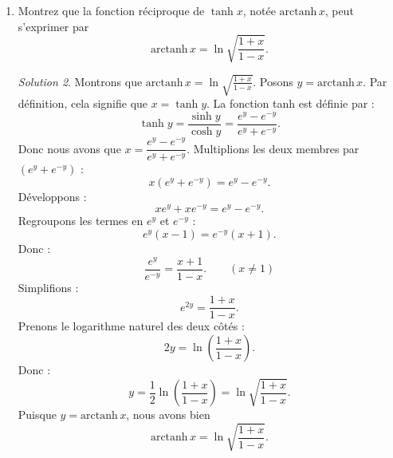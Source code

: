 \documentclass[
  12pt,
  letterpaper,
]{book}
\newenvironment{Shaded}{}{}
\newcommand{\CommentTok}[1]{\textcolor[rgb]{0.42,0.45,0.49}{#1}}
\newcommand{\FloatTok}[1]{\textcolor[rgb]{0.00,0.36,0.77}{#1}}
\newcommand{\NormalTok}[1]{\textcolor[rgb]{0.14,0.16,0.18}{#1}}
\newcommand{\OperatorTok}[1]{\textcolor[rgb]{0.14,0.16,0.18}{#1}}
\newcommand{\StringTok}[1]{\textcolor[rgb]{0.01,0.18,0.38}{#1}}
\newcommand{\VariableTok}[1]{\textcolor[rgb]{0.89,0.38,0.04}{#1}}
\theoremstyle{remark}
\newtheorem*{solution}{Solution}
\begin{document}
\begin{enumerate}
\begin{solution}
\begin{Shaded}
\begin{Highlighting}[]
\CommentTok{\# Configuration du graphique}
\NormalTok{plt.grid(}\VariableTok{True}\NormalTok{, alpha}\OperatorTok{=}\FloatTok{0.3}\NormalTok{)}
\NormalTok{plt.title(}\StringTok{\textquotesingle{}Fonction tanh(x)\textquotesingle{}}\NormalTok{)}
\NormalTok{plt.xlabel(}\StringTok{\textquotesingle{}x\textquotesingle{}}\NormalTok{)}
\NormalTok{plt.ylabel(}\StringTok{\textquotesingle{}y\textquotesingle{}}\NormalTok{)}
\NormalTok{plt.legend()}

\CommentTok{\# Ajustement des limites}
\NormalTok{plt.ylim(}\OperatorTok{{-}}\FloatTok{1.5}\NormalTok{, }\FloatTok{1.5}\NormalTok{)}

\NormalTok{plt.show()}
\end{Highlighting}
\end{Shaded}

  \begin{figure}[H]

  {\centering \texttt{[image: exercices/FonctionsHyp/FonctionsHyp\_files/figure-pdf/cell-2-output-1.pdf]}

  }

  \end{figure}

  \end{solution}
\item
  Montrez que la fonction réciproque de \(\tanh x\), notée
  \(\text{arctanh}\,x\), peut s'exprimer par
  \[\text{arctanh}\,x = \ln \sqrt{\frac{1+x}{1-x}}.\]

  \begin{solution}

  Montrons que \(\text{arctanh}\,x = \ln \sqrt{\frac{1+x}{1-x}}\).
  Posons \(y = \text{arctanh}\,x\). Par définition, cela signifie que
  \(x = \tanh y\). La fonction tanh est définie par :
  \[\tanh y = \frac{\sinh y}{\cosh y} = \frac{e^y - e^{-y}}{e^y + e^{-y}}.\]
  Donc nous avons que \(x = \dfrac{e^y - e^{-y}}{e^y + e^{-y}}\).
  Multiplions les deux membres par \((e^y + e^{-y})\) :
  \[x(e^y + e^{-y}) = e^y - e^{-y}.\] Développons :
  \[xe^y + xe^{-y} = e^y - e^{-y}.\] Regroupons les termes en \(e^y\) et
  \(e^{-y}\) : \[e^y(x-1) = e^{-y}(x+1).\] Donc :
  \[\frac{e^y}{e^{-y}} = \frac{x+1}{1-x}.\qquad(x\neq 1)\] Simplifions :
  \[e^{2y} = \frac{1+x}{1-x}.\] Prenons le logarithme naturel des deux
  côtés : \[2y = \ln\left(\frac{1+x}{1-x}\right).\] Donc :
  \[y = \frac{1}{2}\ln\left(\frac{1+x}{1-x}\right) = \ln\sqrt{\frac{1+x}{1-x}}.\]
  Puisque \(y = \text{arctanh}\,x\), nous avons bien
  \[\text{arctanh}\,x = \ln\sqrt{\frac{1+x}{1-x}}.\]


\end{solution}
\end{enumerate}
\end{document}
